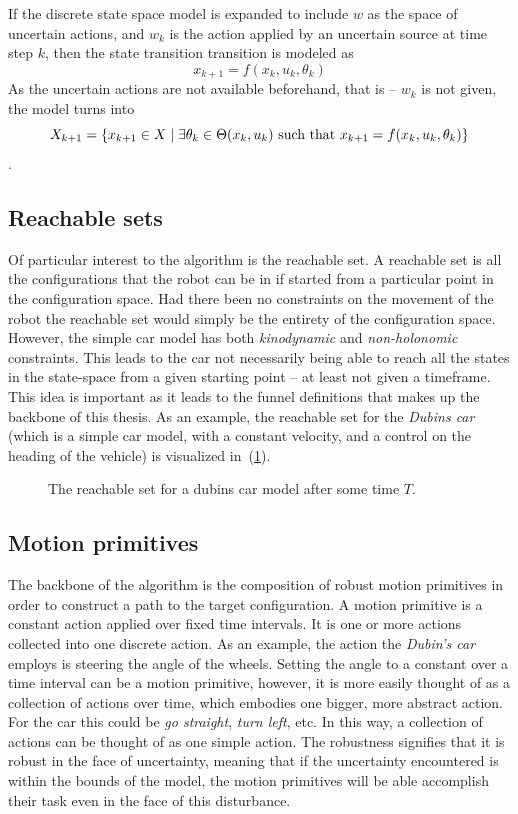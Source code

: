 If the discrete state space model is expanded to include \(w\) as the space of
uncertain actions, and \(w_k\) is the action applied by an uncertain source at
time step \(k\), then the state transition transition is modeled as
\[
  x_{k+1} = f(x_k,u_k,\theta_k)
\]
As the uncertain actions are not available beforehand, that is -- \(w_ k\)
is not given, the model turns into
\[
  X_{k+1} = \lbrace x_{k+1} \in X \mid \exists\theta_k \in \Theta(x_k,u_k) \text{
      such that } x_{k+1} = f(x_k,u_k,\theta_k)\rbrace
\] \cite{Lav06}.

\subsection{Reachable sets}

Of particular interest to the \rrtfunnel{} algorithm is the reachable set. A
reachable set is all the configurations that the robot can be in if started from
a particular point in the configuration space. Had there been no constraints on
the movement of the robot the reachable set would simply be the entirety of the
configuration space. However, the simple car model has both \textit{kinodynamic}
and \textit{non-holonomic} constraints. This leads to the car not necessarily
being able to reach all the states in the state-space from a given starting
point -- at least not given a timeframe. This idea is important as it leads to
the funnel definitions that makes up the backbone of this thesis. As an example,
the reachable set for the \textit{Dubins car} (which is a simple car model, with
a constant velocity, and a control on the heading of the vehicle) is visualized
in~(\ref{fig:reachable-set-dubin}).

\begin{figure}
  \centering 
  \caption{The reachable set for a dubins car model after some time \(T\).}
  \label{fig:reachable-set-dubin}
\end{figure}

\subsection{Motion primitives}

The backbone of the \rrtfunnel{} algorithm is the composition of robust motion
primitives in order to construct a path to the target configuration. A motion
primitive is a constant action applied over fixed time intervals. It is one or
more actions collected into one discrete action. As an example, the action the
\textit{Dubin's car} employs is steering the angle of the wheels. Setting the
angle to a constant over a time interval can be a motion primitive, however, it
is more easily thought of as a collection of actions over time, which embodies
one bigger, more abstract action. For the car this could be \textit{go
  straight}, \textit{turn left}, etc. In this way, a collection of actions can
be thought of as one simple action. The robustness signifies that it is robust
in the face of uncertainty, meaning that if the uncertainty encountered is
within the bounds of the model, the motion primitives will be able accomplish
their task even in the face of this disturbance.

